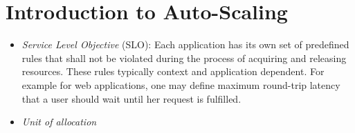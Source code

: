 \chapter{Introduction to Auto-Scaling}
\label{intro-auto-scale}


\begin{itemize}
    \item \emph{Service Level Objective} (SLO): Each application has its own set of predefined rules that shall not be violated during the process of acquiring and releasing resources. These rules typically context and application dependent. For example for web applications, one may define maximum round-trip latency that a user should wait until her request is fulfilled. 
    \item \emph{Unit of allocation}
\end{itemize}